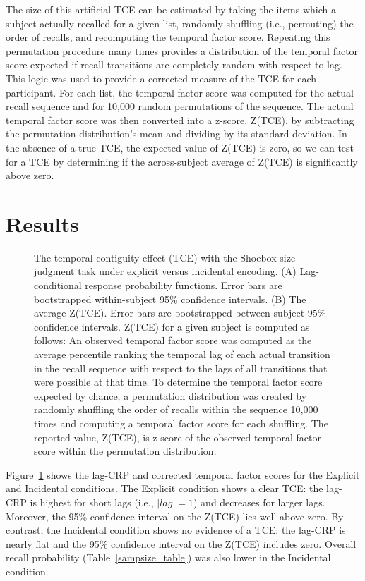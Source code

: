 \documentclass[jou,natbib]{apa6} %
\begin{document}
The size of this artificial TCE can be estimated by taking the items which a subject actually recalled for a given list, randomly shuffling (i.e., permuting) the order of recalls, and recomputing the temporal factor score. Repeating this permutation procedure many times provides a distribution of the temporal factor score expected if recall transitions are completely random with respect to lag. This logic was used to provide a corrected measure of the TCE for each participant. For each list, the temporal factor score was computed for the actual recall sequence and for 10,000 random permutations of the sequence.
The actual temporal factor score was then converted into a z-score, Z(TCE), by subtracting the permutation distribution's mean and dividing by its standard deviation. In the absence of a true TCE, the expected value of Z(TCE) is zero, so we can test for a TCE by determining if the across-subject average of Z(TCE) is significantly above zero.



\section{Results}

\newcommand\paneltext{(A) Lag-conditional response probability functions. Error bars are bootstrapped within-subject 95\% confidence intervals. (B) The average Z(TCE).  Error bars are bootstrapped between-subject 95\% confidence intervals. Z(TCE) for a given subject is computed as follows: An observed temporal factor score was computed as the average percentile ranking the temporal lag of each actual transition in the recall sequence with respect to the lags of all transitions that were possible at that time. To determine the temporal factor score expected by chance, a permutation distribution was created by randomly shuffling the order of recalls within the sequence 10,000 times and computing a temporal factor score for each shuffling. The reported value, Z(TCE), is z-score of the observed temporal factor score within the permutation distribution.}
\begin{figure*}
\caption{The temporal contiguity effect (TCE) with the Shoebox size judgment task under explicit versus incidental encoding. \paneltext}
\label{shoebox}
\end{figure*}



Figure~\ref{shoebox} shows the lag-CRP and corrected temporal factor scores for the Explicit and Incidental conditions. The Explicit condition shows a clear TCE: the lag-CRP is highest for short lags (i.e., $|lag|=1$) and decreases for larger lags. Moreover, the 95\% confidence interval on the Z(TCE) lies well above zero. By contrast, the Incidental condition shows no evidence of a TCE: the lag-CRP is nearly flat and the 95\% confidence interval on the Z(TCE) includes zero. Overall recall probability (Table~\ref{sampsize_table}) was also lower in the Incidental condition.
\end{document}
